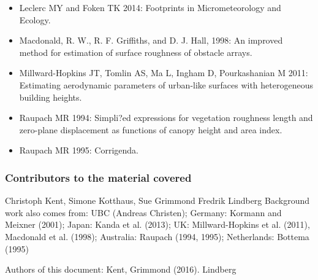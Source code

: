 \documentclass[letterpaper,10pt,english]{sphinxmanual}
\begin{document}
\begin{itemize}
\item {} 
Leclerc MY and Foken TK 2014: Footprints in Micrometeorology and
Ecology. 

\item {} 
Macdonald, R. W., R. F. Griffiths, and D. J. Hall, 1998: An improved
method for estimation of surface roughness of obstacle arrays.

\item {} 
Millward-Hopkins JT, Tomlin AS, Ma L, Ingham D, Pourkashanian M 2011:
Estimating aerodynamic parameters of urban-like surfaces with
heterogeneous building heights. 

\item {} 
Raupach MR 1994: Simpli?ed expressions for vegetation roughness
length and zero-plane displacement as functions of canopy height and
area index. 

\item {} 
Raupach MR 1995: Corrigenda. 

\end{itemize}


\subsubsection{Contributors to the material covered}
\label{\detokenize{Tutorials/Footprint:contributors-to-the-material-covered}}
 Christoph Kent, Simone Kotthaus, Sue Grimmond
 Fredrik Lindberg Background work also
comes from: UBC (Andreas Christen); Germany: Kormann and Meixner (2001);
Japan: Kanda et al. (2013); UK: Millward-Hopkins et al. (2011),
Macdonald et al. (1998); Australia: Raupach (1994, 1995); Netherlands:
Bottema (1995)

Authors of this document: Kent, Grimmond (2016). Lindberg

\end{document}

